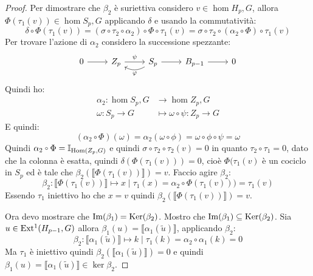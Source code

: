 \begin{proof}
  Per dimostrare che $ \beta_2 $ è suriettiva considero $ v \in \hom{H_p, G} $, allora
  $ \Phi(\tau_1(v)) \in \hom{S_p,G} $ applicando $ \delta $ e usando la commutatività:
  \[
    \delta \circ \Phi(\tau_1(v)) = (\sigma \circ \tau_2 \circ \alpha_2) \circ \Phi \circ \tau_1 (v) = \sigma \circ \tau_2 \circ (\alpha_2 \circ \Phi) \circ \tau_1 (v)
  \]
  Per trovare l'azione di $ \alpha_2 $ considero la successione spezzante:
  \[
    \begin{tikzcd}
      0 \rar & Z_p \rar{\psi} & S_p \arrow[bend left]{l}{\phi} \rar & B_{p-1} \rar & 0
    \end{tikzcd}
  \]
  Quindi ho:
  \begin{align*}
    \alpha_2 \colon \hom{S_p, G} & \to \hom{Z_p, G} \\
    \omega \colon S_p \to G & \mapsto \omega \circ \psi \colon Z_p \to G
  \end{align*}
  E quindi:
  \[
    (\alpha_2 \circ \Phi)(\omega) = \alpha_2(\omega \circ \phi) = \omega \circ \phi \circ \psi = \omega
  \]
  Quindi $ \alpha_2 \circ \Phi = \Id{\hom{Z_p,G}} $ e quindi
  $ \sigma \circ \tau_2 \circ \tau_2 (v) = 0 $ in quanto
  $ \tau_2 \circ \tau_1 = 0 $, dato che la colonna è esatta, quindi
  $ \delta(\Phi(\tau_1(v))) = 0 $, cioè $ \Phi(\tau_1(v) $ è un cociclo in
  $ S_p $ ed è tale che $ \beta_2(\llbracket\Phi(\tau_1(v))\rrbracket) = v $. Faccio
  agire $ \beta_2 $:
  \[
    \beta_2 \colon \llbracket \Phi(\tau_1(v)) \rrbracket \mapsto x \; | \; \tau_1(x) = \alpha_2 \circ \Phi(\tau_1(v)))= \tau_1(v)
  \]
  Essendo $ \tau_1 $ iniettivo ho che $ x = v $ quindi $ \beta_2(\llbracket\Phi(\tau_1(v))\rrbracket) = v $.

  Ora devo mostrare che $ \mathrm{Im}( \beta_1 ) = \mathrm{Ker}( \beta_2) $. Mostro che
  $ \mathrm{Im}( \beta_1 ) \subseteq \mathrm{Ker}( \beta_2) $. Sia $ u \in \mathrm{Ext^1}( H_{p-1},G) $ allora
  $ \beta_1(u) = \llbracket\alpha_1(\tilde{u})\rrbracket $, applicando $ \beta_2 $:
  \[
    \beta_2 \colon \llbracket \alpha_1(\tilde{u}) \rrbracket \mapsto k \; | \; \tau_1(k) = \alpha_2 \circ \alpha_1(k) = 0
  \]
  Ma $ \tau_1 $ è iniettivo quindi $ \beta_2(\llbracket \alpha_1(\tilde{u}) \rrbracket) = 0 $
  e quindi $ \beta_1(u) = \llbracket \alpha_1(\tilde{u}) \rrbracket \in \ker{\beta_2} $.


\end{proof}
